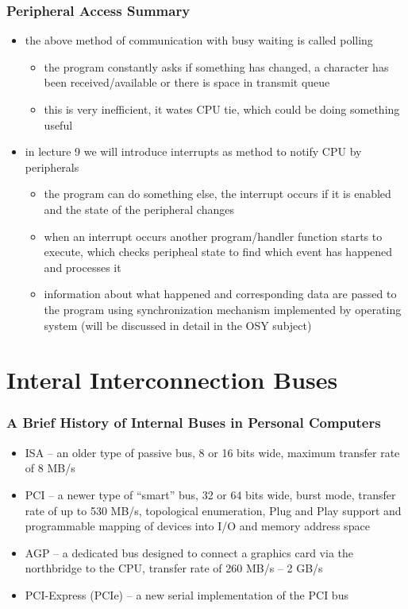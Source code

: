 \documentclass{beamer}
\begin{document}
\begin{frame}
\frametitle{Peripheral Access Summary}

\begin{itemize}
\item the above method of communication  with busy waiting is called polling
\begin{itemize}
\item the program constantly asks if something has changed, a character has been received/available or there is space in transmit queue
\item this is very inefficient, it wates CPU tie, which could be doing something useful
\end{itemize}
\item in lecture 9 we will introduce interrupts as method to notify CPU by peripherals
\begin{itemize}
\item the program can do something else, the interrupt occurs if it is enabled and the state of the peripheral changes
\item when an interrupt occurs another program/handler function starts to execute, which checks peripheal state to find which event has happened and processes it
\item information about what happened and corresponding data are passed to the program using synchronization mechanism implemented by operating system (will be discussed in detail in the OSY subject)
\end{itemize}
\end{itemize}

\end{frame}


\section{Interal Interconnection Buses}

\begin{frame}
\frametitle{A Brief History of Internal Buses in Personal Computers}

\begin{itemize}
\item ISA – an older type of passive bus, 8 or 16 bits wide, maximum transfer rate of 8 MB/s
\item PCI – a newer type of “smart” bus, 32 or 64 bits wide, burst mode, transfer rate of up to 530 MB/s, topological enumeration, Plug and Play support and programmable mapping of devices into I/O and memory address space
\item AGP – a dedicated bus designed to connect a graphics card via the northbridge to the CPU, transfer rate of 260 MB/s – 2 GB/s
\item PCI-Express (PCIe) -- a new serial implementation of the PCI bus
\end{itemize}
\end{frame}
\end{document}
